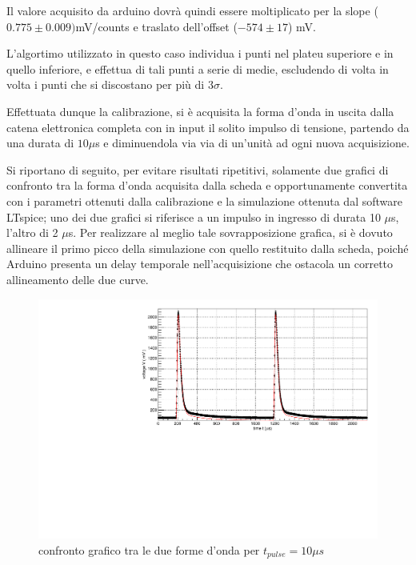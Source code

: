 \documentclass{article}
\begin{document}
Il valore acquisito da arduino dovrà quindi essere moltiplicato per la slope ($0.775 \pm 0.009)$mV/counts
e traslato dell'offset ($-574 \pm 17$) mV.

L'algortimo utilizzato in questo caso individua i punti nel plateu superiore e in quello 
inferiore, e effettua di tali punti a serie di medie, escludendo di volta in volta i punti che si discostano
per più di $3\sigma$.



Effettuata dunque la calibrazione, si è acquisita la forma d'onda in uscita dalla catena elettronica completa con in input il solito
impulso di tensione, partendo da una durata di $10 \mu $s e diminuendola via via di un'unità ad ogni nuova acquisizione.

Si riportano di seguito, per evitare risultati ripetitivi, solamente due grafici di confronto tra la forma d'onda acquisita dalla scheda e opportunamente 
convertita con i parametri ottenuti dalla
calibrazione e la simulazione ottenuta dal software LTspice; uno dei due grafici si riferisce a un impulso in ingresso di durata 10 $\mu $s, l'altro di 2 $\mu $s.
Per realizzare al meglio tale sovrapposizione grafica, si è dovuto allineare il primo picco della simulazione con quello restituito dalla scheda, poiché Arduino
presenta un delay temporale nell'acquisizione che ostacola un corretto allineamento delle due curve.


\begin{center}
\begin{figure}[H]
\centering
\includegraphics[scale=0.4, angle=0]{arduino10.pdf}
\caption{confronto grafico tra le due forme d'onda per $t_{pulse}=10 \mu s$}
\label{fig:arduino10}
\end{figure}
\end{center}
\end{document}
